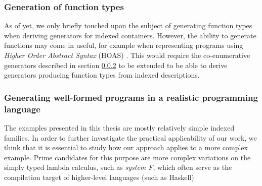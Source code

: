 \documentclass[a4paper,msc,twosized=semi]{uustthesis}
\begin{document}
\subsubsection{Generation of function types}

  As of yet, we only briefly touched upon the subject of generating function types when deriving generators for indexed containers. However, the ability to generate functions may come in useful, for example when representing programs using \emph{Higher Order Abstract Syntax} (HOAS) \cite{pfenning1988higher}. This would require the co-enumerative generators described in section \ref{} to be extended to be able to derive generators producing function types from indexed descriptions. 

\subsubsection{Generating well-formed programs in a realistic programming language}

  The examples presented in this thesis are mostly relatively simple indexed families. In order to further investigate the practical applicability of our work, we think that it is essential to study how our approach applies to a more complex example. Prime candidates for this purpose are more complex variations on the simply typed lambda calculus, such as \emph{system F}, which often serve as the compilation target of higher-level languages (such as Haskell)


\backmatter
\listoffigures



\end{document}
